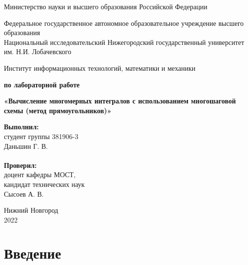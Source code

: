 \documentclass{report}
\begin{document}
\begin{titlepage}
\begin{center}
Министерство науки и высшего образования Российской Федерации
\end{center}
\begin{center}
Федеральное государственное автономное образовательное учреждение высшего образования \\
Национальный исследовательский Нижегородский государственный университет им. Н.И. Лобачевского
\end{center}
\begin{center}
Институт информационных технологий, математики и механики
\end{center}
\vspace{4em}
\begin{center}
\textbf{ по лабораторной работе} \\
\end{center}
\begin{center}
\textbf{\Large«Вычисление многомерных интегралов с использованием многошаговой схемы (метод прямоугольников)»} \\
\end{center}
\vspace{4em}
\newbox{\lbox}
\newlength{\maxl}
\setlength{\maxl}{\wd\lbox}
\hfill\parbox{7cm}{
  \hspace*{5cm}\hspace*{-5cm}\textbf{Выполнил:} \\ студент группы 381906-3 \\ Даньшин Г. В. \\
  \\
  \hspace*{5cm}\hspace*{-5cm}\textbf{Проверил:}\\ доцент кафедры МОСТ, \\ кандидат технических наук \\ Сысоев А. В.\\
}
\vspace{\fill}
\begin{center} Нижний Новгород \\ 2022 \end{center}
\end{titlepage}

\setcounter{page}{2}

\tableofcontents

\clearpage

\section*{Введение}
\end{document}
